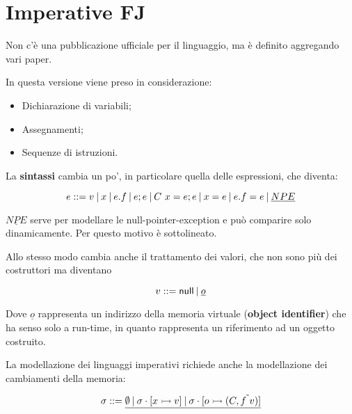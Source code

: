 


\section{Imperative FJ}

Non c'è una pubblicazione ufficiale per il linguaggio, ma è definito aggregando vari paper.

In questa versione viene preso in considerazione:

\begin{itemize}
	\item Dichiarazione di variabili;
	\item Assegnamenti;
	\item Sequenze di istruzioni.
\end{itemize}

La \textbf{sintassi} cambia un po', in particolare quella delle espressioni, che diventa:

$$
e ::= v \:|\: x \:|\: e.f \:|\: e;e \:|\: C \ x = e ; e \:|\: x = e \:|\: e.f = e \:|\: \underline{NPE}
$$

\noindent $\underline{NPE}$ serve per modellare le null-pointer-exception e può comparire solo dinamicamente. Per questo motivo è sottolineato.

Allo stesso modo cambia anche il trattamento dei valori, che non sono più dei costruttori ma diventano

$$
v ::= \Null \vbar \underline{o}
$$

\noindent Dove $\underline{o}$ rappresenta un indirizzo della memoria virtuale (\textbf{object identifier}) che ha senso solo a run-time, in quanto rappresenta un riferimento ad un oggetto costruito.

La modellazione dei linguaggi imperativi richiede anche la modellazione dei cambiamenti della memoria:

$$
\sigma ::= \underline{\emptyset \vbar \sigma \cdot [x \rat v] \vbar \sigma \cdot [o \rat (C, \tilde{f \ v})]}
$$

